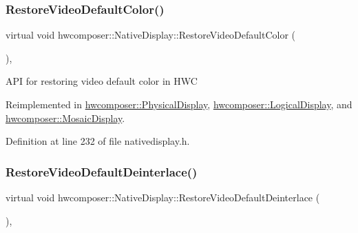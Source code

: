 \subsubsection{\texorpdfstring{Restore\+Video\+Default\+Color()}{RestoreVideoDefaultColor()}}
{\footnotesize\ttfamily virtual void hwcomposer\+::\+Native\+Display\+::\+Restore\+Video\+Default\+Color (\begin{DoxyParamCaption}\item[{H\+W\+C\+Color\+Control}]{ }\end{DoxyParamCaption})\hspace{0.3cm}{\ttfamily [inline]}, {\ttfamily [virtual]}}

A\+PI for restoring video default color in H\+WC 

Reimplemented in \mbox{\hyperlink{classhwcomposer_1_1PhysicalDisplay_ac9b499aa64a9bbc3c49e55011c56e819}{hwcomposer\+::\+Physical\+Display}}, \mbox{\hyperlink{classhwcomposer_1_1LogicalDisplay_aabeca956b6c48031fd0c9c862e7cd9cc}{hwcomposer\+::\+Logical\+Display}}, and \mbox{\hyperlink{classhwcomposer_1_1MosaicDisplay_aaf2a3e4f69753b92366c23434db3d133}{hwcomposer\+::\+Mosaic\+Display}}.



Definition at line 232 of file nativedisplay.\+h.


\begin{DoxyCode}{0}
\end{DoxyCode}
\mbox{\label{classhwcomposer_1_1NativeDisplay_a686a2906dbe6543523a9f5fb5b4ae3f7}} 
\subsubsection{\texorpdfstring{Restore\+Video\+Default\+Deinterlace()}{RestoreVideoDefaultDeinterlace()}}
{\footnotesize\ttfamily virtual void hwcomposer\+::\+Native\+Display\+::\+Restore\+Video\+Default\+Deinterlace (\begin{DoxyParamCaption}{ }\end{DoxyParamCaption})\hspace{0.3cm}{\ttfamily [inline]}, {\ttfamily [virtual]}}

